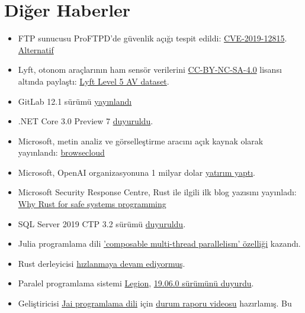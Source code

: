 \documentclass[11pt]{article}
\begin{document}
\section{Diğer Haberler}
\label{sec:org76eb7d1}
\begin{itemize}
\item FTP sunucusu ProFTPD'de güvenlik açığı tespit edildi: \href{https://tbspace.de/cve201912815proftpd.html}{CVE-2019-12815}.
\href{https://nvd.nist.gov/vuln/detail/CVE-2019-12815}{Alternatif}
\item Lyft, otonom araçlarının ham sensör verilerini \href{https://creativecommons.org/licenses/by-nc-sa/4.0/}{CC-BY-NC-SA-4.0} lisansı
altında paylaştı: \href{https://level5.lyft.com/dataset/}{Lyft Level 5 AV dataset}.
\item GitLab 12.1 sürümü \href{https://about.gitlab.com/2019/07/22/gitlab-12-1-released/}{yayınlandı}
\item .NET Core 3.0 Preview 7 \href{https://devblogs.microsoft.com/dotnet/announcing-net-core-3-0-preview-7}{duyuruldu}.
\item Microsoft, metin analiz ve görselleştirme aracını açık kaynak olarak
yayınlandı: \href{https://github.com/microsoft/browsecloud}{browsecloud}
\item Microsoft, OpenAI organizasyonuna 1 milyar dolar \href{https://openai.com/blog/microsoft/}{yatırım yaptı}.
\item Microsoft Security Response Centre, Rust ile ilgili ilk blog yazısını
yayınladı: \href{https://msrc-blog.microsoft.com/2019/07/22/why-rust-for-safe-systems-programming/}{Why Rust for safe systems programming}
\item SQL Server 2019 CTP 3.2 sürümü \href{https://cloudblogs.microsoft.com/sqlserver/2019/07/24/sql-server-2019-community-technology-preview-3-2-is-now-available/}{duyuruldu}.
\item Julia programlama dili \href{https://julialang.org/blog/2019/07/multithreading}{'composable multi-thread parallelism' özelliği} kazandı.
\item Rust derleyicisi \href{https://blog.mozilla.org/nnethercote/2019/07/25/the-rust-compiler-is-still-getting-faster/}{hızlanmaya devam ediyormuş}.
\item Paralel programlama sistemi \href{https://legion.stanford.edu/overview/}{Legion}, \href{https://github.com/StanfordLegion/legion/releases/tag/legion-19.06.0}{19.06.0 sürümünü duyurdu}.
\item Geliştiricisi \href{https://inductive.no/jai/}{Jai programlama dili} için \href{https://www.youtube.com/watch?v=4\_ODvZ01CjU}{durum raporu videosu} hazırlamış. Bu

\end{itemize}
\end{document}
